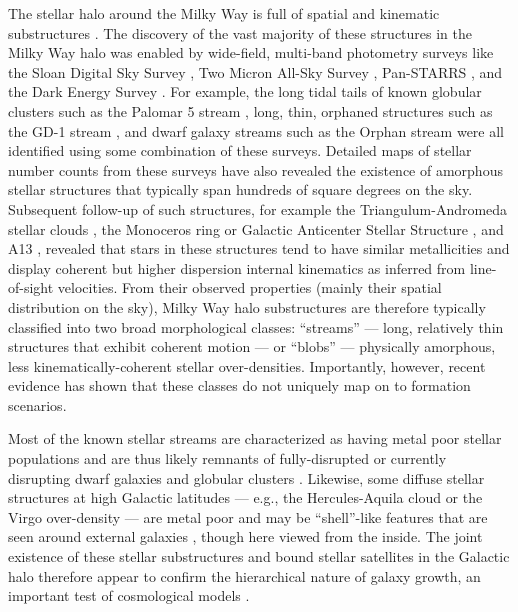 \documentclass[twocolumn]{aastex62}
\begin{document}
The stellar halo around the Milky Way is full of spatial and kinematic
substructures \citep[e.g.,][]{Grillmair:2016}.
The discovery of the vast majority of these structures in the Milky Way halo was
enabled by wide-field, multi-band photometry surveys like the Sloan Digital Sky
Survey \cite[SDSS;][]{York:2000, Gunn:2006, Eisenstein:2011}, Two Micron All-Sky
Survey \citep[2MASS;][]{Skrutskie:2006}, Pan-STARRS
\citep[PS1;][]{Chambers:2016}, and the Dark Energy Survey
\citep[DES;][]{Dark-Energy-Survey-Collaboration:2016}.
For example, the long tidal tails of known globular clusters such as the Palomar
5 stream \citep{Odenkirchen:2001}, long, thin, orphaned structures such as the
GD-1 stream \citep{Grillmair:2006}, and dwarf galaxy streams such as the Orphan
stream \citep{Grillmair:2006a} were all identified using some combination of
these surveys.
Detailed maps of stellar number counts from these surveys have also revealed the
existence of amorphous stellar structures that typically span hundreds of square
degrees on the sky.
Subsequent follow-up of such structures, for example the Triangulum-Andromeda
stellar clouds \citep[TriAnd;][]{Rocha-Pinto:2004, Martin:2007, Sheffield:2014},
the Monoceros ring or Galactic Anticenter Stellar Structure
\citep[Mon/GASS;][]{Newberg:2002, Yanny:2003, Crane:2003, Li:2012,
Morganson:2014}, and A13 \citep{Sharma:2010, Li:2017}, revealed that stars in
these structures tend to have similar metallicities and display coherent but
higher dispersion internal kinematics as inferred from line-of-sight velocities.
From their observed properties (mainly their spatial distribution on the sky),
Milky Way halo substructures are therefore typically classified into two broad
morphological classes: ``streams'' --- long, relatively thin structures that
exhibit coherent motion --- or ``blobs'' --- physically amorphous, less
kinematically-coherent stellar over-densities.
Importantly, however, recent evidence has shown that these classes do not
uniquely map on to formation scenarios.

Most of the known stellar streams are characterized as having metal poor stellar
populations and are thus likely remnants of fully-disrupted or currently
disrupting dwarf galaxies and globular clusters \citep{TODO}.
Likewise, some diffuse stellar structures at high Galactic latitudes --- e.g.,
the Hercules-Aquila cloud \citep{Belokurov:2007, Simion:2014} or the Virgo
over-density \citep{Vivas:2001, Carlin:2012} --- are metal poor and may be
``shell''-like features that are seen around external galaxies
\citep[e.g.,][]{Kado-Fong:2018}, though here viewed from the inside.
The joint existence of these stellar substructures and bound stellar satellites
in the Galactic halo therefore appear to confirm the hierarchical nature of
galaxy growth, an important test of cosmological models \citep{Bullock:2005, Johnston:2008}.
\end{document}
